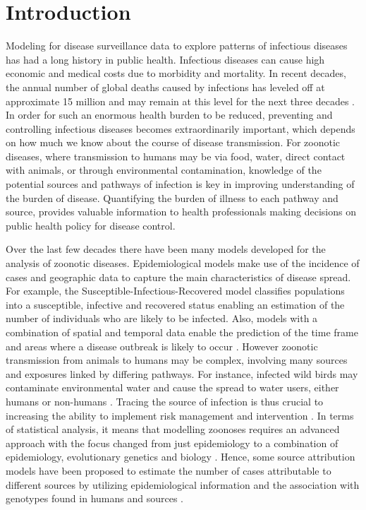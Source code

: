 \documentclass[times, doublespace]{WileyNJD-v2}%
\begin{document}
\section{Introduction}
Modeling for disease surveillance data to explore patterns of infectious diseases has had a long history in public health. Infectious diseases can cause high economic and medical costs due to morbidity and mortality. In recent decades, the annual number of global deaths caused by infections has leveled off at approximate 15 million and may remain at this level for the next three decades \cite{DyeC, WHOM}. In order for such an enormous health burden to be reduced, preventing and controlling infectious diseases becomes extraordinarily important, which depends on how much we know about the course of disease transmission. For zoonotic diseases, where transmission to humans may be via food, water, direct contact with animals, or through environmental contamination, knowledge of the potential sources and pathways of infection is key in improving understanding of the burden of disease. Quantifying the burden of illness to each pathway and source, provides valuable information to health professionals making decisions on public health policy for disease control. 

Over the last few decades there have been many models developed for the analysis of zoonotic diseases. Epidemiological models make use of the incidence of cases and geographic data to capture the main characteristics of disease spread. For example, the Susceptible-Infectious-Recovered model \cite{Kerm} classifies populations into a susceptible, infective and recovered status enabling an estimation of the number of individuals who are likely to be infected. Also, models with a combination of spatial and temporal data enable the prediction of the time frame and areas where a disease outbreak is likely to occur \cite{HeldL, Hoehl, Simo}. However zoonotic transmission from animals to humans may be complex, involving many sources and exposures linked by differing pathways. For instance, infected wild birds may contaminate environmental water and cause the spread to water users, either humans or non-humans \cite{Wagen}. Tracing the source of infection is thus crucial to increasing the ability to implement risk management and intervention \cite{Wilso, Morel}. In terms of statistical analysis, it means that modelling zoonoses requires an advanced approach with the focus changed from just epidemiology to a combination of epidemiology, evolutionary genetics and biology \cite{Muell}. Hence, some source attribution models have been proposed to estimate the number of cases attributable to different sources by utilizing epidemiological information and the association with genotypes found in humans and sources \cite{vanP, Hald, MullA}. 
\end{document}
